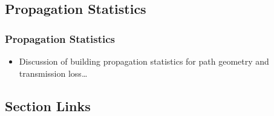 \documentclass[letterpaper,10pt,english]{sphinxmanual}
\begin{document}
\subsection{Propagation Statistics}
\label{\detokenize{analysis:propagation-statistics}}

\subsubsection{Propagation Statistics}
\label{\detokenize{analysis:propagation}}\begin{itemize}
\item {} 
Discussion of building propagation statistics for path geometry and transmission loss…

\end{itemize}


\subsection{Section Links}
\end{document}
